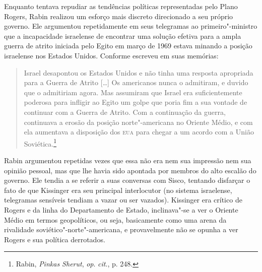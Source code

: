 Enquanto tentava repudiar as tendências políticas representadas pelo
Plano Rogers, Rabin realizou um esforço mais discreto direcionado a seu
próprio governo. Ele argumentou repetidamente em seus telegramas ao
primeiro"-ministro que a incapacidade israelense de encontrar uma solução
efetiva para a ampla guerra de atrito iniciada pelo Egito em março de
1969 estava minando a posição israelense nos Estados Unidos. Conforme
escreveu em suas memórias: 

\begin{quote}
Israel desapontou os Estados Unidos e não
tinha uma resposta apropriada para a Guerra de Atrito {[}\ldots{}{]} Os americanos
nunca o admitiram, e duvido que o admitiriam agora. Mas assumiram que
Israel era suficientemente poderosa para infligir ao Egito um golpe que
poria fim a sua vontade de continuar com a Guerra de Atrito. Com a
continuação da guerra, continuava a erosão da posição norte"-americana no
Oriente Médio, e com ela aumentava a disposição dos \textsc{eua} para chegar a um
acordo com a União Soviética.\footnote{Rabin, \textit{Pinkas Sherut}, 
\textit{op}. \textit{cit}., p. 248.}
\end{quote}

Rabin argumentou repetidas vezes que essa não era nem sua impressão nem
sua opinião pessoal, mas que lhe havia sido apontada por membros do alto
escalão do governo. Ele tendia a se referir a suas conversas com Sisco,
tentando disfarçar o fato de que Kissinger era seu principal
interlocutor (no sistema israelense, telegramas sensíveis tendiam a
vazar ou ser vazados). Kissinger era crítico de Rogers e da linha do
Departamento de Estado, inclinava"-se a ver o Oriente Médio em termos
geopolíticos, ou seja, basicamente como uma arena da rivalidade
soviético"-norte"-americana, e provavelmente não se opunha a ver
Rogers e sua política derrotados.

